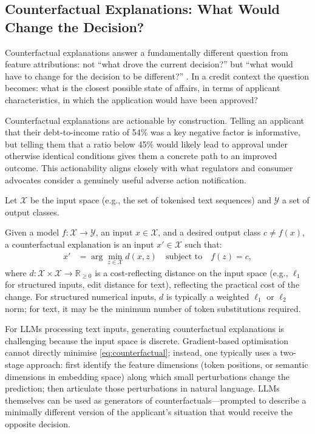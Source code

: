 \subsection{Counterfactual Explanations: What Would Change the Decision?}
\label{sec:ch12-counterfactual}

Counterfactual explanations answer a fundamentally different question from feature
attributions: not ``what drove the current decision?'' but ``what would have to change
for the decision to be different?'' \cite{wachter2017counterfactual}. In a credit context
the question becomes: what is the closest possible state of affairs, in terms of
applicant characteristics, in which the application would have been approved?

Counterfactual explanations are actionable by construction. Telling an applicant that
their debt-to-income ratio of 54\% was a key negative factor is informative, but telling
them that a ratio below 45\% would likely lead to approval under otherwise identical
conditions gives them a concrete path to an improved outcome. This actionability aligns
closely with what regulators and consumer advocates consider a genuinely useful adverse
action notification.

Let $\mathcal{X}$ be the input space (e.g., the set of tokenised text sequences) and $\mathcal{Y}$ a set of output classes.

\begin{definition}
\label{def:counterfactual-explanation}
Given a model $f: \mathcal{X} \to \mathcal{Y}$, an input $x \in \mathcal{X}$, and a
desired output class $c \ne f(x)$, a counterfactual explanation is an input
$x' \in \mathcal{X}$ such that:
\begin{align}
\label{eq:counterfactual}
x' &= \arg\min_{z \in \mathcal{X}} d(x, z) \quad \text{subject to} \quad f(z) = c,
\end{align}
where $d:\mathcal{X}\times\mathcal{X}\to\mathbb{R}_{\geq 0}$ is a cost-reflecting distance on the input space (e.g., $\ell_1$ for structured inputs, edit distance for text), reflecting the practical cost of the change. For structured numerical inputs, $d$ is typically a weighted $\ell_1$ or
$\ell_2$ norm; for text, it may be the minimum number of token substitutions required.
\end{definition}

For LLMs processing text inputs, generating counterfactual explanations is challenging
because the input space is discrete. Gradient-based optimisation cannot directly minimise
\eqref{eq:counterfactual}; instead, one typically uses a two-stage approach: first
identify the feature dimensions (token positions, or semantic dimensions in embedding
space) along which small perturbations change the prediction; then articulate those
perturbations in natural language. LLMs themselves can be used as generators of
counterfactuals---prompted to describe a minimally different version of the applicant's
situation that would receive the opposite decision.

